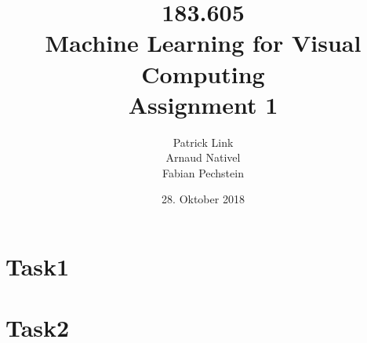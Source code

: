 \documentclass[a4]{article}
\title{\bf 183.605 \\ Machine Learning for Visual Computing \\ Assignment 1}
\author{Patrick Link \\ Arnaud Nativel \\ Fabian Pechstein}
\date{28. Oktober 2018}
\begin{document}
\maketitle
\noindent

\section{Task1}


\section{Task2}

\end{document}
